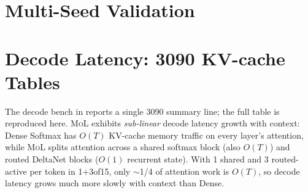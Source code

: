 \documentclass[10pt]{article}
\newcommand{\mol}{\textsc{MoL}}
\begin{document}
\section{Multi-Seed Validation}
\label{app:multiseed}

\begin{table}[h]
\centering
\caption{Multi-seed validation (seeds 42, 137, 256) on WikiText-103, 50K steps.}
\label{tab:multiseed}
\small
{}
\end{table}

\section{Decode Latency: 3090 KV-cache Tables}
\label{app:decode}

The decode bench in  reports a single 3090 summary line; the full table is reproduced here. \mol{} exhibits \emph{sub-linear} decode latency growth with context: Dense Softmax has $O(T)$ KV-cache memory traffic on every layer's attention, while \mol{} splits attention across a shared softmax block (also $O(T)$) and routed DeltaNet blocks ($O(1)$ recurrent state). With 1 shared and 3 routed-active per token in 1+3of15, only $\sim$1/4 of attention work is $O(T)$, so decode latency grows much more slowly with context than Dense.
\end{document}
